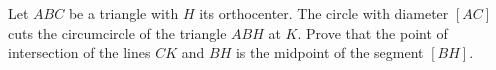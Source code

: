 \documentclass[varwidth]{standalone}
\begin{document}
    Let $ABC$ be a triangle with $H$ its orthocenter. The circle with diameter $[AC]$ cuts the circumcircle of the triangle $ABH$ at $K$. Prove that the point of intersection of the lines $CK$ and $BH$ is the midpoint of the segment $[BH]$.
\end{document}

